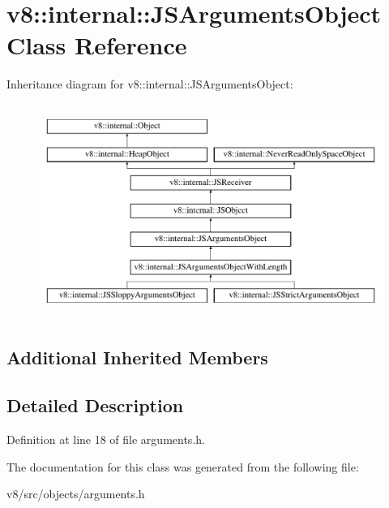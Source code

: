 \hypertarget{classv8_1_1internal_1_1JSArgumentsObject}{}\section{v8\+:\+:internal\+:\+:J\+S\+Arguments\+Object Class Reference}
\label{classv8_1_1internal_1_1JSArgumentsObject}
Inheritance diagram for v8\+:\+:internal\+:\+:J\+S\+Arguments\+Object\+:\begin{figure}[H]
\begin{center}
\leavevmode
\includegraphics[height=7.000000cm]{classv8_1_1internal_1_1JSArgumentsObject}
\end{center}
\end{figure}
\subsection*{Additional Inherited Members}


\subsection{Detailed Description}


Definition at line 18 of file arguments.\+h.



The documentation for this class was generated from the following file\+:\begin{DoxyCompactItemize}
\item 
v8/src/objects/arguments.\+h\end{DoxyCompactItemize}
